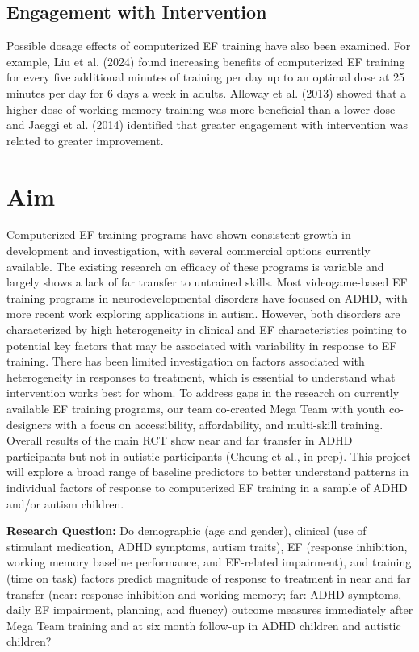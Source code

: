 \documentclass[
  letterpaper,
]{ut-thesis}
\begin{document}
\subsection{Engagement with
Intervention}\label{engagement-with-intervention}

Possible dosage effects of computerized EF training have also been
examined. For example, Liu et al. (2024) found increasing benefits of
computerized EF training for every five additional minutes of training
per day up to an optimal dose at 25 minutes per day for 6 days a week in
adults. Alloway et al. (2013) showed that a higher dose of working
memory training was more beneficial than a lower dose and Jaeggi et al.
(2014) identified that greater engagement with intervention was related
to greater improvement.

\section{Aim}\label{aim}

Computerized EF training programs have shown consistent growth in
development and investigation, with several commercial options currently
available. The existing research on efficacy of these programs is
variable and largely shows a lack of far transfer to untrained skills.
Most videogame-based EF training programs in neurodevelopmental
disorders have focused on ADHD, with more recent work exploring
applications in autism. However, both disorders are characterized by
high heterogeneity in clinical and EF characteristics pointing to
potential key factors that may be associated with variability in
response to EF training. There has been limited investigation on factors
associated with heterogeneity in responses to treatment, which is
essential to understand what intervention works best for whom. To
address gaps in the research on currently available EF training
programs, our team co-created Mega Team with youth co-designers with a
focus on accessibility, affordability, and multi-skill training. Overall
results of the main RCT show near and far transfer in ADHD participants
but not in autistic participants (Cheung et al., in prep). This project
will explore a broad range of baseline predictors to better understand
patterns in individual factors of response to computerized EF training
in a sample of ADHD and/or autism children.

\textbf{Research Question:} Do demographic (age and gender), clinical
(use of stimulant medication, ADHD symptoms, autism traits), EF
(response inhibition, working memory baseline performance, and
EF-related impairment), and training (time on task) factors predict
magnitude of response to treatment in near and far transfer (near:
response inhibition and working memory; far: ADHD symptoms, daily EF
impairment, planning, and fluency) outcome measures immediately after
Mega Team training and at six month follow-up in ADHD children and
autistic children?
\end{document}
